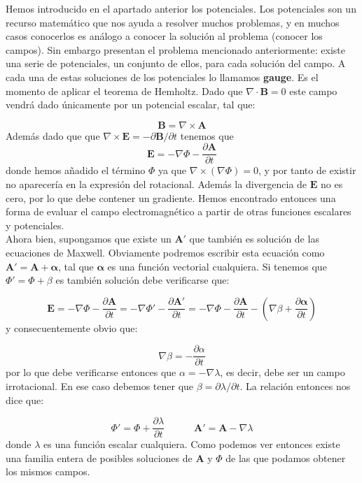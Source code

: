 \documentclass[12pt,a4paper]{article}
\newcommand{\parentesis}[1]{\left( #1  \right)}
\newcommand{\parciales}[2]{\frac{\partial #1}{\partial #2}}
\newcommand{\tquad}{\quad \quad \quad}
\newcommand{\rota}{\nabla \times}
\newcommand{\dive}{\nabla \cdot}
\newcommand{\Bn}{\mathbf{B}}
\newcommand{\En}{\mathbf{E}}
\newcommand{\An}{\mathbf{A}}
\numberwithin{equation}{section}
\numberwithin{figure}{section}
\begin{document}
Hemos introducido en el apartado anterior los potenciales. Los potenciales son un recurso matemático que nos ayuda a resolver muchos problemas, y en muchos casos conocerlos es análogo a conocer la solución al problema (conocer los campos). Sin embargo presentan el problema mencionado anteriormente: existe una serie de potenciales, un conjunto de ellos, para cada solución del campo. A cada una de estas soluciones de los potenciales lo llamamos \textbf{gauge}. Es el momento de aplicar el teorema de Hemholtz. Dado que $\dive \Bn = 0$ este campo vendrá dado únicamente por un potencial escalar, tal que:

\begin{equation}
\Bn = \rota  \An
\end{equation}
Además dado que que $\rota \En =- \partial \Bn / \partial t$ tenemos que
\begin{equation}
\En = - \nabla \Phi - \parciales{\An}{t}
\end{equation}
donde hemos añadido el término $\Phi$ ya que $\rota (\nabla \Phi)= 0$, y por tanto de existir no aparecería en la expresión del rotacional. Además la divergencia de $\En$ no es cero, por lo que debe contener un gradiente. Hemos encontrado entonces una forma de evaluar el campo electromagnético a partir de otras funciones escalares y potenciales. \\

Ahora bien, supongamos que existe un $\An'$ que también es solución de las ecuaciones de Maxwell. Obviamente podremos escribir esta ecuación como $\An' = \An + \boldsymbol{\alpha}$, tal que $\boldsymbol{\alpha}$ es una función vectorial cualquiera. Si tenemos que $\Phi '=\Phi + \beta$ es también solución debe verificarse que:

$$
\En = - \nabla \Phi - \parciales{\An}{t} = - \nabla \Phi ' - \parciales{\An '}{t} = - \nabla \Phi - \parciales{\An}{t}  - \parentesis{  \nabla \beta + \parciales{\boldsymbol{\alpha}}{t}}
$$
y consecuentemente obvio que:

$$
\nabla \beta = - \parciales{\alpha}{t}
$$
por lo que debe verificarse entonces que $\alpha = - \nabla \lambda$, es decir, debe ser un campo irrotacional. En ese caso debemos tener que $\beta = \partial \lambda / \partial t$. La relación entonces nos dice que: 

\begin{equation}
\Phi ' =  \Phi + \parciales{\lambda}{t} \tquad \An' = \An - \nabla \lambda
\end{equation} 
donde $\lambda$ es una función escalar cualquiera. Como podemos ver entonces existe una familia entera de posibles soluciones de $\An$ y $\Phi$ de las que podamos obtener los mismos campos. \\
\end{document}
